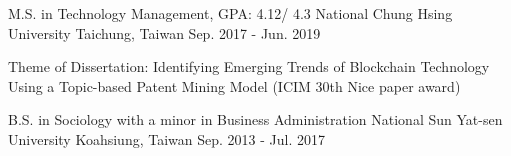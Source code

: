 



\begin{cventries}

  \cventry
    {M.S. in Technology Management, GPA: 4.12/ 4.3} %
    {National Chung Hsing University} %
    {Taichung, Taiwan} %
    {Sep. 2017 - Jun. 2019} %
    {\begin{cvitems} %
        \item {Theme of Dissertation: Identifying Emerging Trends of Blockchain Technology Using a Topic-based Patent Mining Model (ICIM 30th Nice paper award)}
      \end{cvitems}}
    
  \cventry
    {B.S. in Sociology with a minor in Business Administration} %
    {National Sun Yat-sen University} %
    {Koahsiung, Taiwan} %
    {Sep. 2013 - Jul. 2017} %
    {}
    
\end{cventries}


